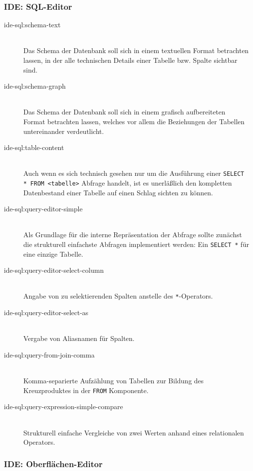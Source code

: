 \subsubsection{IDE: SQL-Editor}

\begin{description}
\item[ide-sql:schema-text] \hfill\\
  Das Schema der Datenbank soll sich in einem textuellen Format betrachten lassen, in der alle technischen Details einer Tabelle bzw. Spalte sichtbar sind.
\item[ide-sql:schema-graph] \hfill\\
  Das Schema der Datenbank soll sich in einem grafisch aufbereiteten Format betrachten lassen, welches vor allem die Beziehungen der Tabellen untereinander verdeutlicht.
\item[ide-sql:table-content] \hfill\\
  Auch wenn es sich technisch gesehen nur um die Ausführung einer \lstinline{SELECT * FROM <tabelle>} Abfrage handelt, ist es unerläßlich den kompletten Datenbestand einer Tabelle auf einen Schlag sichten zu können.
\item[ide-sql:query-editor-simple] \hfill\\
  Als Grundlage für die interne Repräsentation der Abfrage sollte zunächst die strukturell einfachste Abfragen implementiert werden: Ein \lstinline{SELECT *} für eine einzige Tabelle.
\item[ide-sql:query-editor-select-column] \hfill\\
  Angabe von zu selektierenden Spalten anstelle des \lstinline{*}-Operators.
\item[ide-sql:query-editor-select-as] \hfill\\
  Vergabe von Aliasnamen für Spalten.
\item[ide-sql:query-from-join-comma] \hfill\\
  Komma-separierte Aufzählung von Tabellen zur Bildung des Kreuzproduktes in der \lstinline{FROM} Komponente.
\item[ide-sql:query-expression-simple-compare] \hfill\\
  Strukturell einfache Vergleiche von zwei Werten anhand eines relationalen Operators.
\end{description}

\subsubsection{IDE: Oberflächen-Editor}

